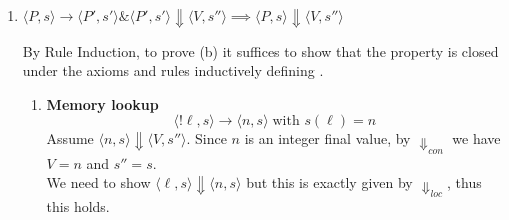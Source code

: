 \begin{solution}
\begin{enumerate}[label=(\alph*)]
\item $\langle P,s\rangle \rightarrow \langle P',s'\rangle \& \langle P',s'\rangle \Downarrow \langle V,s''\rangle \implies \langle P,s\rangle \Downarrow \langle V,s''\rangle$

By Rule Induction, to prove (b) it suffices to show that the property is closed under the axioms and rules inductively defining . 

\begin{enumerate}[label=(\alph{enumi}).\arabic*]

\item \textbf{Memory lookup} \[\langle !\ell, s\rangle \to \langle n,s\rangle \; \text{with }s(\ell) = n\]
Assume $\langle n,s\rangle \Downarrow \langle V,s''\rangle$. Since $n$ is an integer final value, by $\Downarrow_{con}$ we have $V = n$ and $s''=s$. 
\\
We need to show $\langle \ell, s\rangle \Downarrow \langle n,s\rangle$ but this is exactly given by $\Downarrow_{loc}$, thus this holds.


\end{enumerate}
\end{enumerate}
\end{solution}
